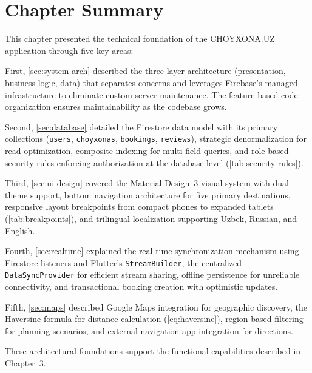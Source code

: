 \section{Chapter Summary}
\label{sec:ch2-summary}

This chapter presented the technical foundation of the CHOYXONA.UZ application through five key areas:

First, \cref{sec:system-arch} described the three-layer architecture (presentation, business logic, data) that separates concerns and leverages Firebase's managed infrastructure to eliminate custom server maintenance.
The feature-based code organization ensures maintainability as the codebase grows.

Second, \cref{sec:database} detailed the Firestore data model with its primary collections (\texttt{users}, \texttt{choyxonas}, \texttt{bookings}, \texttt{reviews}), strategic denormalization for read optimization, composite indexing for multi-field queries, and role-based security rules enforcing authorization at the database level (\cref{tab:security-rules}).

Third, \cref{sec:ui-design} covered the Material Design~3 visual system with dual-theme support, bottom navigation architecture for five primary destinations, responsive layout breakpoints from compact phones to expanded tablets (\cref{tab:breakpoints}), and trilingual localization supporting Uzbek, Russian, and English.

Fourth, \cref{sec:realtime} explained the real-time synchronization mechanism using Firestore listeners and Flutter's \texttt{StreamBuilder}, the centralized \texttt{DataSyncProvider} for efficient stream sharing, offline persistence for unreliable connectivity, and transactional booking creation with optimistic updates.

Fifth, \cref{sec:maps} described Google Maps integration for geographic discovery, the Haversine formula for distance calculation (\cref{eq:haversine}), region-based filtering for planning scenarios, and external navigation app integration for directions.

These architectural foundations support the functional capabilities described in Chapter~3.
